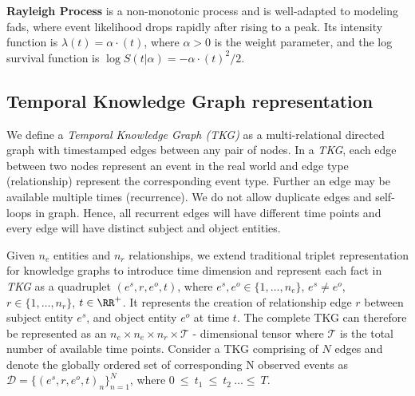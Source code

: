 \documentclass{article}
\begin{document}
{\bf Rayleigh Process} is a non-monotonic process and is well-adapted to modeling fads, where event likelihood drops rapidly after rising to a peak. Its intensity function is $\lambda(t) = \alpha \cdot (t)$, where $\alpha > 0$ is the weight parameter, and the log survival function is $ \log S(t|\alpha) = -\alpha \cdot (t)^ 2 / 2$. 

\vspace{-0.3cm}
\subsection{Temporal Knowledge Graph representation}

We define a \emph{Temporal Knowledge Graph (TKG)} as a multi-relational directed graph with timestamped edges between any pair of nodes. In a \emph{TKG}, each edge between two nodes represent an event in the real world and edge type (relationship) represent the corresponding event type. Further an edge may be available multiple times (recurrence). We do not allow duplicate edges and self-loops in graph. Hence, all recurrent edges will have different time points and every edge will have distinct subject and object entities.
 
Given $n_e$ entities and $n_r$ relationships, we extend traditional  triplet representation for knowledge graphs to introduce time dimension and represent each fact in \emph{TKG} as a quadruplet $(e^s, r, e^o, t)$,  where $e^s, e^o \in \{1, \ldots, n_e\}$, $e^s \ne e^o$, $r \in \{1, \ldots, n_r\}$, $t \in \RR^+$. It represents the creation of relationship edge $r$ between subject entity $e^s$, and object entity $e^o$ at time $t$. The complete TKG can therefore be represented as an $n_e \times n_e \times n_r \times \mathcal{T}$ - dimensional tensor where $\mathcal{T}$ is the total number of available time points.  
Consider a TKG comprising of $N$ edges and denote the globally ordered set of corresponding N observed events as $\mathcal{D} = \{(e^s, r, e^o, t)_n\}_{n=1}^N$, where $0~\le~t_1~\le~t_2~\ldots\le~T$.
\end{document}
